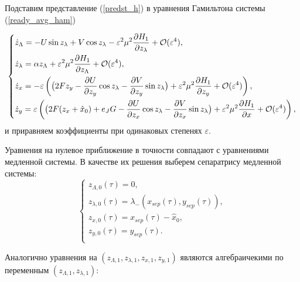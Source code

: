 Подставим представление (\ref{predst_h}) в уравнения Гамильтона системы (\ref{ready_avg_ham})

\begin{equation}
    \begin{dcases}
        \dot z_\Lambda = - U \sin z_\lambda + V \cos z_\lambda - \varepsilon^2 \mu^2 \frac{\partial H_1}{\partial z_\lambda} + \mathcal{O}(\varepsilon^4), \\
        \dot z_\lambda = \alpha z_\Lambda + \varepsilon^2 \mu^2 \frac{\partial H_1}{\partial z_\Lambda} + \mathcal{O}(\varepsilon^4), \\
        \dot z_x = -\varepsilon \left( \big( 2Fz_y-\frac{\partial U}{\partial z_y} \cos z_\lambda - \frac{\partial V}{\partial z_y} \sin z_\lambda \big) + \varepsilon^2 \mu^2 \frac{\partial H_1}{\partial z_y}  + \mathcal{O}(\varepsilon^4) \right), \\
        \dot z_y = \varepsilon \left( \big( 2F(z_x+\hat x_0)+e_JG -\frac{\partial U}{\partial z_x} \cos z_\lambda - \frac{\partial V}{\partial z_x} \sin z_\lambda \big) + \varepsilon^2 \mu^2 \frac{\partial H_1}{\partial x}  + \mathcal{O}(\varepsilon^4) \right), \\
    \end{dcases}
    \label{fulltn2}
\end{equation}
 и приравняем коэффициенты при одинаковых степенях $\varepsilon$.

Уравнения на нулевое приближение в точности совпадают с уравнениями медленной системы. В качестве их решения выберем сепаратрису медленной системы:
\begin{equation*}
    \begin{cases}
        z_{\Lambda,0}(\tau) = 0 , \\
        
        z_{\lambda,0}(\tau) = \lambda_- (x_{sep}(\tau),y_{sep}(\tau)), \\
        
        z_{x,0}(\tau) = x_{sep}(\tau) - \hat x_0, \\
        
        z_{y,0}(\tau) = y_{sep}(\tau).\\
    \end{cases}
\end{equation*}

Аналогично уравнения на $(z_{\Lambda,1},z_{\lambda,1},z_{x,1},z_{y,1})$ являются алгебраичекими по переменным $(z_{\Lambda,1},z_{\lambda,1})$:
    
